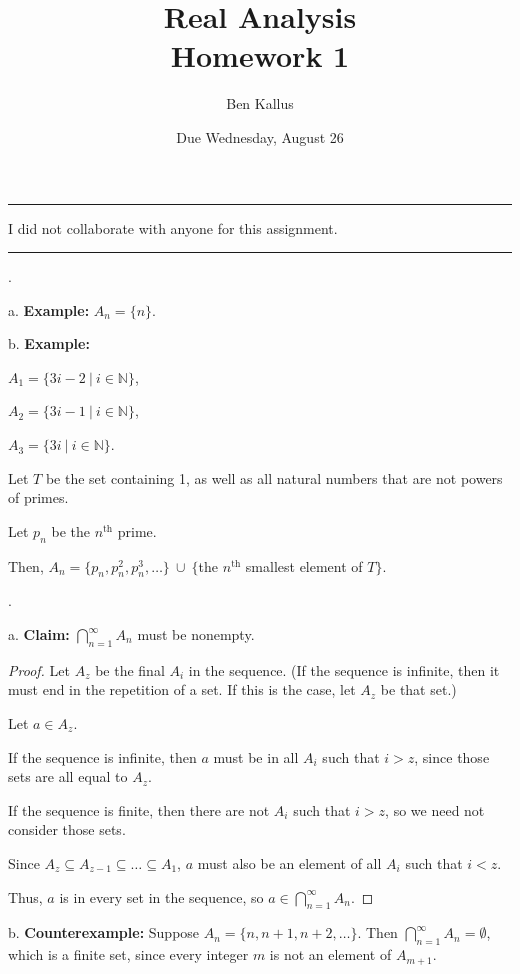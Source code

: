 \documentclass[12pt]{article}
\title{Real Analysis \\ Homework 1}
\author{Ben Kallus}
\date{Due Wednesday, August 26}
\begin{document}
\maketitle

\hrule
\bigskip

  I did not collaborate with anyone for this assignment.

\bigskip
\hrule
\bigskip

.

\noindent a. {\bf Example:} $A_n = \{n\}$.

\bigskip
\noindent b. {\bf Example:}

$A_1 = \{3i - 2~|~i \in \mathbb N\}$,

$A_2 = \{3i - 1~|~i \in \mathbb N\}$,

$A_3 = \{3i~|~i \in \mathbb N\}$.

\bigskip
{}

Let $T$ be the set containing 1, as well as all natural numbers that are not powers of primes.

Let $p_n$ be the $n^\text{th}$ prime.

Then, $A_n = \{p_n, p_n^2, p_n^3, \hdots\}~\cup~\{$the $n^\text{th}$ smallest element of $T\}$.

\newpage
{}.

\noindent a. {\bf Claim:}  $\bigcap\limits_{n=1}^\infty A_n$ must be nonempty.

\begin{proof}
    Let $A_z$ be the final $A_i$ in the sequence. (If the sequence is infinite, then it must end in the repetition of a set. If this is the case, let $A_z$ be that set.)
    
    Let $a \in A_z$.
    
    If the sequence is infinite, then $a$ must be in all $A_i$ such that $i > z$, since those sets are all equal to $A_z$.
    
    If the sequence is finite, then there are not $A_i$ such that $i > z$, so we need not consider those sets.
    
    Since $A_z \subseteq A_{z-1} \subseteq \hdots \subseteq A_1$, $a$ must also be an element of all $A_i$ such that $i < z$.
    
    Thus, $a$ is in every set in the sequence, so $a \in \bigcap\limits_{n=1}^\infty A_n$.
\end{proof}

\medskip
\noindent b. {\bf Counterexample:} Suppose $A_n = \{n,n+1,n+2,\hdots\}$. Then  $\bigcap\limits_{n=1}^\infty A_n =\emptyset$, which is a finite set, since every integer $m$ is not an element of $A_{m+1}$.
\end{document}
